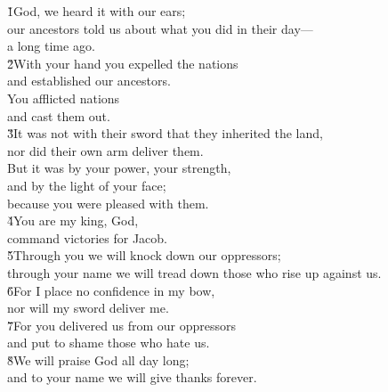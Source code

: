 \begin{poetry}
\poeml \v{1}God, we heard it with our ears; \\
\poemll    our ancestors told us about what you did in their day--- \\
\poemlll       a long time ago. \\
\poeml \v{2}With your hand you expelled the nations \\
\poemll    and established our ancestors. \\
\poeml You afflicted nations \\
\poemll    and cast them out. \\
\poeml \v{3}It was not with their sword that they inherited the land, \\
\poemll    nor did their own arm deliver them. \\
\poeml But it was by your power, your strength, \\
\poemll    and by the light of your face; \\
\poemlll       because you were pleased with them. \\
\poeml \v{4}You are my king, God, \\
\poemll    command victories for Jacob. \\
\poeml \v{5}Through you we will knock down our oppressors; \\
\poemll    through your name we will tread down those who rise up against us. \\
\poeml \v{6}For I place no confidence in my bow, \\
\poemll    nor will my sword deliver me. \\
\poeml \v{7}For you delivered us from our oppressors \\
\poemll    and put to shame those who hate us. \\
\poeml \v{8}We will praise God all day long; \\
\poemll    and to your name we will give thanks forever.
\end{poetry}

